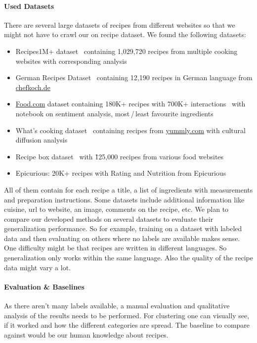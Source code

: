 \documentclass[
     12pt,         %
     a4paper,      %
     BCOR10mm,     %
     DIV14,        %
     ]{article}
\begin{document}
\paragraph{Used Datasets} There are several large datasets of recipes from different websites so that we might not have to crawl our on recipe dataset. We found the following datasets:
\begin{itemize}
  \item Recipes1M+ dataset~\cite{marin2019recipe1m} containing 1,029,720 recipes from multiple cooking websites with corresponding analysis~\cite{8099810}
  \item German Recipes Dataset~\cite{germanrecipesdataset} containing 12,190 recipes in German language from \url{chefkoch.de}
  \item \url{Food.com} dataset containing 180K+ recipes with 700K+ interactions~\cite{foodcominteractions} with notebook on sentiment analysis, most\,/\,least favourite ingredients
  \item What's cooking dataset~\cite{whatscooking} containing recipes from \url{yummly.com} with cultural diffusion analysis~\cite{cultdiffusion}
  \item Recipe box dataset~\cite{recipebox} with \~125,000 recipes from various food websites
  \item Epicurious: 20K+ recipes with Rating and Nutrition from Epicurious~\cite{epirecipes}
\end{itemize}
All of them contain for each recipe a title, a list of ingredients with measurements and preparation instructions. Some datasets include additional information like cuisine, url to website, an image, comments on the recipe, etc.
We plan to compare our developed methods on several datasets to evaluate their generalization performance. So for example, training on a dataset with labeled data and then evaluating on others where no labels are available makes sense. One difficulty might be that recipes are written in different languages. So generalization only works within the same language. Also the quality of the recipe data might vary a lot.

\paragraph{Evaluation \& Baselines} As there aren't many labels available, a manual evaluation and qualitative analysis of the results needs to be performed. For clustering one can visually see, if it worked and how the different categories are spread. The baseline to compare against would be our human knowledge about recipes.
\end{document}

